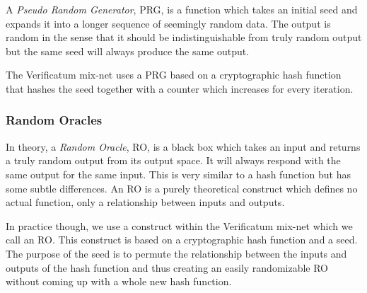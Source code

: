 A \emph{Pseudo Random Generator}, PRG, is a function which takes an
initial seed and expands it into a longer sequence of seemingly random
data.\cite[p.~170]{hac} The output is random in the sense that it should be
indistinguishable from truly random output but the same seed will
always produce the same output.

The Verificatum mix-net uses a PRG based on a cryptographic hash
function that hashes the seed together with a counter which increases
for every iteration.

\subsubsection{Random Oracles}

In theory, a \emph{Random Oracle}, RO, is a black box which takes an
input and returns a truly random output from its output space.\cite{oracle} It will
always respond with the same output for the same input. This is very
similar to a hash function but has some subtle differences. An RO is a
purely theoretical construct which defines no actual function, only a
relationship between inputs and outputs.

In practice though, we use a construct within the Verificatum mix-net
which we call an RO. This construct is based on a cryptographic hash
function and a seed. The purpose of the seed is to permute the
relationship between the inputs and outputs of the hash function and
thus creating an easily randomizable RO without coming up with a whole
new hash function.

